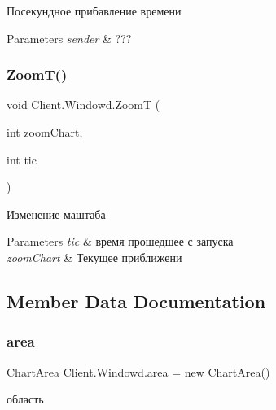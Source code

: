 Посекундное прибавление времени 


\begin{DoxyParams}{Parameters}
{\em sender} & ???\\
\hline
\end{DoxyParams}
\hypertarget{class_client_1_1_windowd_aac30e6623a96e0bc508e9f4e82d4bb65}{}\label{class_client_1_1_windowd_aac30e6623a96e0bc508e9f4e82d4bb65} 
\subsubsection{\texorpdfstring{Zoom\+T()}{ZoomT()}}
{\footnotesize\ttfamily void Client.\+Windowd.\+ZoomT (\begin{DoxyParamCaption}\item[{int}]{zoom\+Chart,  }\item[{int}]{tic }\end{DoxyParamCaption})\hspace{0.3cm}{\ttfamily [inline]}}



Изменение маштаба 


\begin{DoxyParams}{Parameters}
{\em tic} & время прошедшее с запуска\\
\hline
{\em zoom\+Chart} & Текущее приближени\\
\hline
\end{DoxyParams}


\subsection{Member Data Documentation}
\hypertarget{class_client_1_1_windowd_aed40d5c999bd377a5e6a11b6f09e3f9c}{}\label{class_client_1_1_windowd_aed40d5c999bd377a5e6a11b6f09e3f9c} 
\subsubsection{\texorpdfstring{area}{area}}
{\footnotesize\ttfamily Chart\+Area Client.\+Windowd.\+area = new Chart\+Area()}



область 

\hypertarget{class_client_1_1_windowd_a63515d43501540d22908b3e75b0446e6}{}\label{class_client_1_1_windowd_a63515d43501540d22908b3e75b0446e6} 
